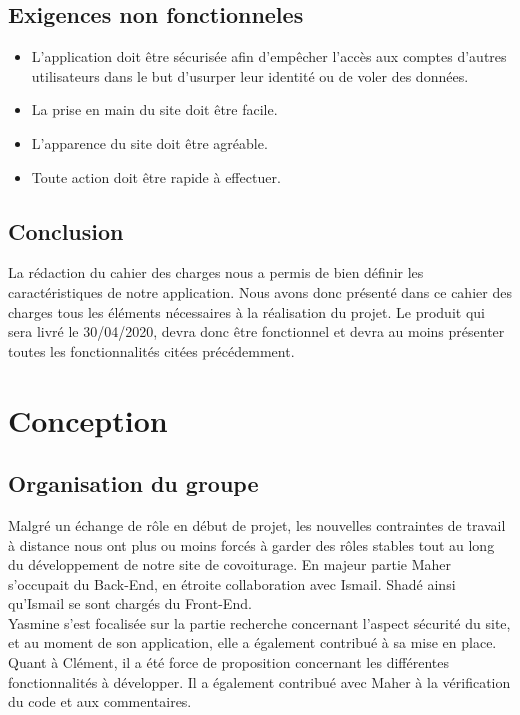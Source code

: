 \documentclass{article}
\begin{document}
\subsection{Exigences non fonctionneles}
\begin{itemize}
    \item L'application doit être sécurisée afin d’empêcher l’accès aux comptes d’autres utilisateurs dans le but d’usurper leur identité ou de voler des données. 
    \item La prise en main du site doit être facile.
    \item L’apparence du site doit être agréable.
    \item Toute action doit être rapide à effectuer.
\end{itemize}

\subsection{Conclusion}
La rédaction du cahier des charges nous a permis de bien définir les caractéristiques de notre application. Nous avons donc présenté dans ce cahier des charges tous les éléments nécessaires à la réalisation du projet. Le produit qui sera livré le 30/04/2020, devra donc être fonctionnel et devra au moins présenter toutes les fonctionnalités citées précédemment.

\section{Conception}
\subsection{Organisation du groupe}
Malgré un échange de rôle en début de projet, les nouvelles contraintes de travail à distance nous ont plus ou moins forcés à garder des rôles stables tout au long du développement de notre site de covoiturage. 
En majeur partie Maher s’occupait du Back-End, en étroite collaboration avec Ismail. 
Shadé ainsi qu’Ismail se sont chargés du Front-End. \\
Yasmine s’est focalisée sur la partie recherche concernant l’aspect sécurité du site, et au moment de son application, elle a également contribué à sa mise en place. \\
Quant à Clément, il a été force de proposition concernant les différentes fonctionnalités à développer. Il a également contribué avec Maher à la vérification du code et aux commentaires.
\end{document}
